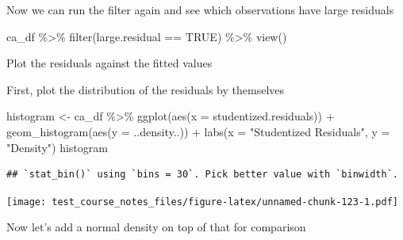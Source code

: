 \documentclass[
]{book}
\newenvironment{Shaded}{\begin{snugshade}}{\end{snugshade}}
\newcommand{\AttributeTok}[1]{\textcolor[rgb]{0.77,0.63,0.00}{#1}}
\newcommand{\ConstantTok}[1]{\textcolor[rgb]{0.00,0.00,0.00}{#1}}
\newcommand{\FunctionTok}[1]{\textcolor[rgb]{0.00,0.00,0.00}{#1}}
\newcommand{\NormalTok}[1]{#1}
\newcommand{\OtherTok}[1]{\textcolor[rgb]{0.56,0.35,0.01}{#1}}
\newcommand{\SpecialCharTok}[1]{\textcolor[rgb]{0.00,0.00,0.00}{#1}}
\newcommand{\StringTok}[1]{\textcolor[rgb]{0.31,0.60,0.02}{#1}}
\begin{document}
Now we can run the filter again and see which observations have large residuals

\begin{Shaded}
\begin{Highlighting}[]
\NormalTok{ca\_df }\SpecialCharTok{\%\textgreater{}\%} \FunctionTok{filter}\NormalTok{(large.residual }\SpecialCharTok{==} \ConstantTok{TRUE}\NormalTok{) }\SpecialCharTok{\%\textgreater{}\%} \FunctionTok{view}\NormalTok{()}
\end{Highlighting}
\end{Shaded}

Plot the residuals against the fitted values

\begin{Shaded}
\end{Shaded}

First, plot the distribution of the residuals by themselves

\begin{Shaded}
\begin{Highlighting}[]
\NormalTok{histogram }\OtherTok{\textless{}{-}}\NormalTok{ ca\_df }\SpecialCharTok{\%\textgreater{}\%} 
  \FunctionTok{ggplot}\NormalTok{(}\FunctionTok{aes}\NormalTok{(}\AttributeTok{x =}\NormalTok{ studentized.residuals)) }\SpecialCharTok{+}
  \FunctionTok{geom\_histogram}\NormalTok{(}\FunctionTok{aes}\NormalTok{(}\AttributeTok{y =}\NormalTok{ ..density..)) }\SpecialCharTok{+}
  \FunctionTok{labs}\NormalTok{(}\AttributeTok{x =} \StringTok{"Studentized Residuals"}\NormalTok{,}
       \AttributeTok{y =} \StringTok{"Density"}\NormalTok{)}
\NormalTok{histogram}
\end{Highlighting}
\end{Shaded}

\begin{verbatim}
## `stat_bin()` using `bins = 30`. Pick better value with `binwidth`.
\end{verbatim}

\texttt{[image: test\_course\_notes\_files/figure-latex/unnamed-chunk-123-1.pdf]}

Now let's add a normal density on top of that for comparison
\end{document}
